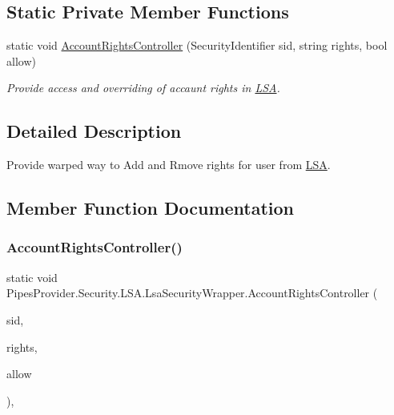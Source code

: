 \subsection*{Static Private Member Functions}
\begin{DoxyCompactItemize}
\item 
static void \mbox{\hyperlink{class_pipes_provider_1_1_security_1_1_l_s_a_1_1_lsa_security_wrapper_a13ce034059c39f7a1a93d06a45b07d94}{Account\+Rights\+Controller}} (Security\+Identifier sid, string rights, bool allow)
\begin{DoxyCompactList}\small\item\em Provide access and overriding of accaunt rights in \mbox{\hyperlink{namespace_pipes_provider_1_1_security_1_1_l_s_a}{L\+SA}}. \end{DoxyCompactList}\end{DoxyCompactItemize}


\subsection{Detailed Description}
Provide warped way to Add and Rmove rights for user from \mbox{\hyperlink{namespace_pipes_provider_1_1_security_1_1_l_s_a}{L\+SA}}. 



\subsection{Member Function Documentation}
\mbox{\label{class_pipes_provider_1_1_security_1_1_l_s_a_1_1_lsa_security_wrapper_a13ce034059c39f7a1a93d06a45b07d94}} 
\subsubsection{\texorpdfstring{Account\+Rights\+Controller()}{AccountRightsController()}}
{\footnotesize\ttfamily static void Pipes\+Provider.\+Security.\+L\+S\+A.\+Lsa\+Security\+Wrapper.\+Account\+Rights\+Controller (\begin{DoxyParamCaption}\item[{Security\+Identifier}]{sid,  }\item[{string}]{rights,  }\item[{bool}]{allow }\end{DoxyParamCaption})\hspace{0.3cm}{\ttfamily [static]}, {\ttfamily [private]}}



